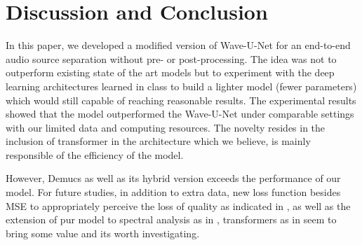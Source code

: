 \documentclass[final]{cvpr}
\begin{document}
\section*{Discussion and Conclusion}
In this paper, we developed a modified version of Wave-U-Net for an end-to-end audio source separation without pre- or post-processing. The idea was not to outperform existing state of the art models but to experiment with the deep learning architectures learned in class to build a lighter model (fewer parameters) which would still capable of reaching reasonable results. The experimental results showed that the model outperformed the Wave-U-Net \cite{waveunet} under comparable settings with our limited data and computing resources. The novelty resides in the inclusion of transformer in the architecture which we believe, is mainly responsible of the efficiency of the model.

However, Demucs \cite{defossez2019music} as well as its hybrid version \cite{hybrid-demucs} exceeds the performance of our model. For future studies, in addition to extra data, new loss function besides MSE to appropriately perceive the loss of quality as indicated in \cite{waveunet}, as well as the extension of pur model to spectral analysis as in \cite{hybrid-demucs}, transformers as in \cite{dptnet} seem to bring some value and its worth investigating.   
{\small


}
\end{document}

